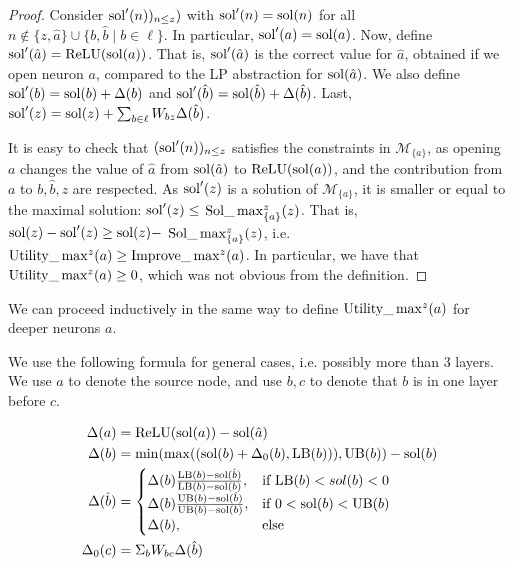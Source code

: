 	\begin{proof}
    Consider $\mathrm{sol}'(n))_{n \leq z})$ with
	$\mathrm{sol}'(n)=\mathrm{sol}(n)$ for all $n \notin \{z,\hat{a}\} \cup \{b,\hat{b} \mid b \in \ell\}$. In particular,  $\mathrm{sol}'(a) = \mathrm{sol}(a)$.
	Now, define $\mathrm{sol}'(\hat{a}) = \mathrm{ReLU}(\mathrm{sol}(a))$. 
	That is, $\mathrm{sol}'(\hat{a})$ is the correct value for $\hat{a}$, obtained if we open neuron $a$, compared to the LP abstraction for $\mathrm{sol}(\hat{a})$.
	We also define $\mathrm{sol}'(b)=\mathrm{sol}(b)+\Delta(b)$ and 
	$\mathrm{sol}'(\hat{b})=\mathrm{sol}(\hat{b}) + \Delta(\hat{b})$.
	Last, $\mathrm{sol}'(z)=\mathrm{sol}(z) + \sum_{b \in \ell} W_{bz} \Delta(\hat{b})$.
	
	It is easy to check that $(\mathrm{sol}'(n))_{n \leq z}$ satisfies the constraints in 
	$\mathcal{M}_{\{a\}}$, as opening $a$ changes the value of $\hat{a}$ from
	$\mathrm{sol}(\hat{a})$ to $\mathrm{ReLU}(\mathrm{sol}(a))$, and the contribution from $a$ to $b,\hat{b},z$ 
	are respected.
	As $\mathrm{sol}'(z)$ is a solution of $\mathcal{M}_{\{a\}}$, it is smaller or equal to the maximal solution: $\mathrm{sol}'(z) \leq$ $\mathrm{Sol}\_\max_{\{a\}}^z(z)$. That is, 
	$\mathrm{sol}(z)-\mathrm{sol}'(z) \geq \mathrm{sol}(z) -$ $\mathrm{Sol}\_\max_{\{a\}}^z(z)$, i.e. 
	$ \mathrm{Utility}\_\max^z(a) \geq \mathrm{Improve}\_\max^z(a)$.
	In particular, we have that $\mathrm{Utility}\_\max^z(a) \geq 0$, which was not obvious from the definition.
	\end{proof}
	

We can proceed inductively in the same way to define $\mathrm{Utility}\_\max^z(a)$ for deeper neurons $a$.

We use the following formula for general cases, i.e. possibly more than 3 layers. We use $a$ to denote the source node, and use $b,c$ to denote that $b$ is in one layer before $c$. 

\begin{align*}
	\Delta(a) &= \mathrm{ReLU}(\mathrm{sol}(a))-\mathrm{sol}(\hat{a})\\
		\Delta(b) &= \min(\max((\mathrm{sol}(b)+\Delta_0(b),\mathrm{LB}(b))),\mathrm{UB}(b))-\mathrm{sol}(b)\\
		\Delta(\hat{b}) &=
		\begin{cases}
		\Delta(b)\frac{\mathrm{LB}(b) - \mathrm{sol}(\hat{b})}{\mathrm{LB}(b) - \mathrm{sol}(b)},  &\text{if } \mathrm{LB}(b)< sol(b) < 0\\
		\Delta(b)\frac{\mathrm{UB}(b) - \mathrm{sol}(\hat{b})}{\mathrm{UB}(b) - \mathrm{sol}(b)},  &\text{if }  0< \mathrm{sol}(b) < \mathrm{UB}(b)\\
			\Delta(b),  &\text{else } 	 
		\end{cases}\\
	\Delta_0(c) &= \Sigma_{b} W_{bc}\Delta(\hat{b})
\end{align*}


